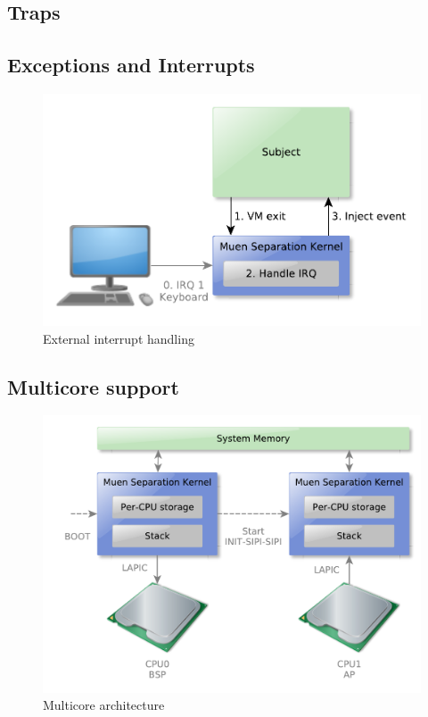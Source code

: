 \subsection{Traps}
\subsection{Exceptions and Interrupts}
\begin{figure}[h]
	\centering
	\includegraphics[scale=0.6]{images/external-interrupt}
	\caption{External interrupt handling}
	\label{fig:external-interrupt}
\end{figure}

\subsection{Multicore support}
\begin{figure}[h]
	\centering
	\includegraphics[scale=0.6]{images/mp-overview}
	\caption{Multicore architecture}
	\label{fig:mp-overview}
\end{figure}

